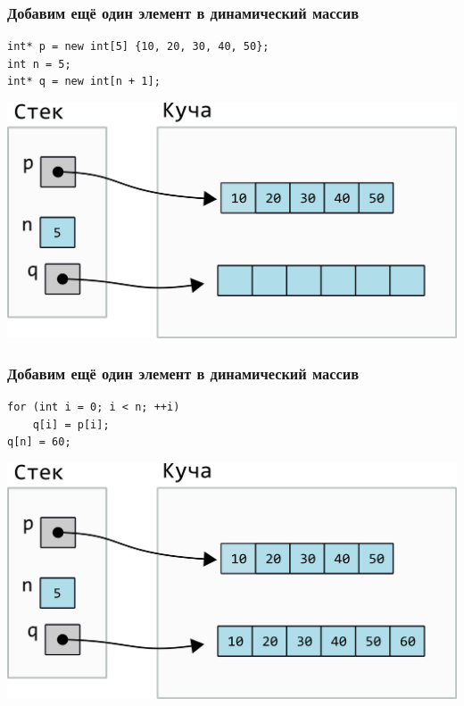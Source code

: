 \documentclass[10pt,pdf,hyperref={unicode}]{beamer}
\begin{document}
\begin{frame}[fragile]
\frametitle{Добавим ещё один элемент в динамический массив} 
\begin{lstlisting}
int* p = new int[5] {10, 20, 30, 40, 50};
int n = 5;
int* q = new int[n + 1];
\end{lstlisting}
\begin{center}
\includegraphics[scale=0.6]{images/dynamic_array/dynamic_array_add_one1.png}
\end{center}
\end{frame}

\begin{frame}[fragile]
\frametitle{Добавим ещё один элемент в динамический массив} 
\begin{lstlisting}
for (int i = 0; i < n; ++i)
    q[i] = p[i];
q[n] = 60;
\end{lstlisting}
\begin{center}
\includegraphics[scale=0.6]{images/dynamic_array/dynamic_array_add_one2.png}
\end{center}
\end{frame}
\end{document}
